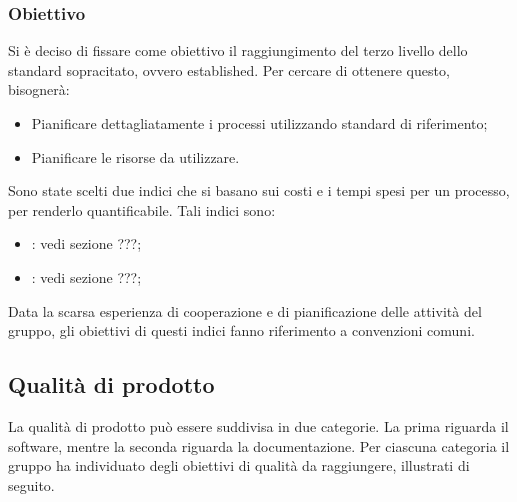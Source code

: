\subsubsection{Obiettivo} 
Si è deciso di fissare come obiettivo il raggiungimento del terzo livello dello standard sopracitato, ovvero established. Per cercare di ottenere questo, bisognerà:
\begin{itemize}
\item Pianificare dettagliatamente i processi utilizzando standard di riferimento;
\item Pianificare le risorse da utilizzare.
\end{itemize}
Sono state scelti due indici che si basano sui costi e i tempi spesi per un processo, per renderlo quantificabile. Tali indici sono:
\begin{itemize}
\item {}: vedi sezione ???;
\item {}: vedi sezione ???;
\end{itemize} 
Data la scarsa esperienza di cooperazione e di pianificazione delle attività del gruppo, gli obiettivi di questi indici fanno riferimento a convenzioni comuni.

\subsection{Qualità di prodotto} %
\label{2.1.2}
La qualità di prodotto può essere suddivisa in due categorie. La prima riguarda il software, mentre la seconda riguarda la documentazione. Per ciascuna categoria il gruppo ha individuato degli obiettivi di qualità da raggiungere, illustrati di seguito.
